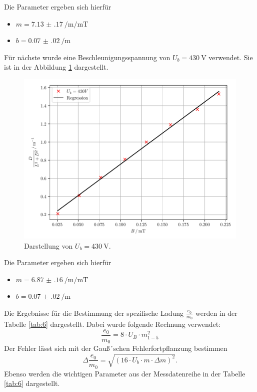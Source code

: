 Die Parameter ergeben sich hierfür
\begin{itemize}
  \item $m = \SI[per-mode=fraction]{7.13(17)}{\per\meter\per\milli\tesla}$
  \item $b =\SI[per-mode=fraction]{0.07(02)}{\per\meter}$
\end{itemize}
Für nächste wurde eine Beschleunigungsspannung von $U_b = \SI{430}{\volt}$ verwendet.
Sie ist in der Abbildung \ref{abb:16} dargestellt.
\begin{figure}[H]
  \centering
  \includegraphics{plot11.pdf}
  \caption{Darstellung von $U_b=\SI{430}{\volt}$.}
  \label{abb:16}
\end{figure}
Die Parameter ergeben sich hierfür
\begin{itemize}
  \item $m = \SI[per-mode=fraction]{6.87(16)}{\per\meter\per\milli\tesla}$
  \item $b =\SI[per-mode=fraction]{0.07(02)}{\per\meter}$
\end{itemize}

Die Ergebnisse für die Bestimmung der spezifische Ladung $\frac{e_0}{m_0}$ werden
in der Tabelle \ref{tab:6} dargestellt. Dabei wurde folgende Rechnung verwendet:
\begin{equation*}
  \frac{e_0}{m_0} = 8 \cdot U_B \cdot m_{1-5}^2
\end{equation*}
Der Fehler lässt sich mit der Gauß´schen Fehlerfortpflanzung bestimmen
\begin{equation*}
  \Delta \frac{e_0}{m_0} = \sqrt{(16 \cdot U_b \cdot m \cdot \Delta m)^2}.
\end{equation*}
Ebenso werden die wichtigen Parameter aus der Messdatenreihe in der Tabelle \ref{tab:6}
dargestellt.

